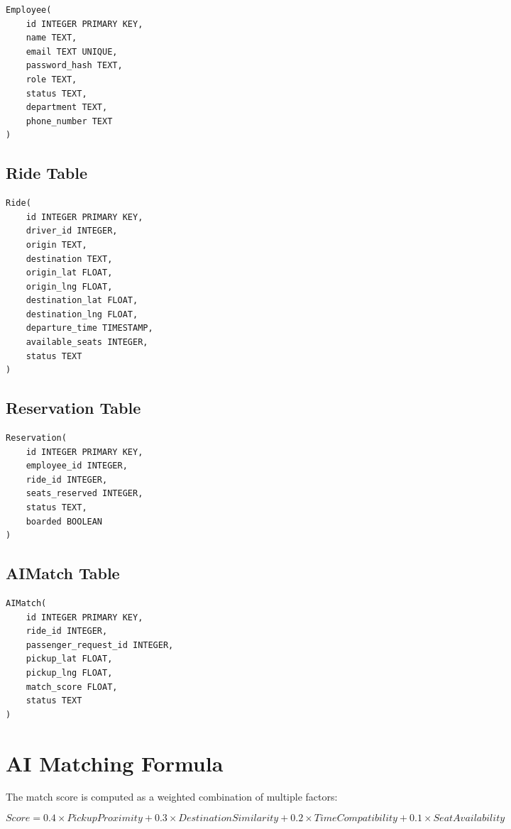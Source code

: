 \begin{verbatim}
Employee(
    id INTEGER PRIMARY KEY,
    name TEXT,
    email TEXT UNIQUE,
    password_hash TEXT,
    role TEXT,
    status TEXT,
    department TEXT,
    phone_number TEXT
)
\end{verbatim}

\subsection{Ride Table}

\begin{verbatim}
Ride(
    id INTEGER PRIMARY KEY,
    driver_id INTEGER,
    origin TEXT,
    destination TEXT,
    origin_lat FLOAT,
    origin_lng FLOAT,
    destination_lat FLOAT,
    destination_lng FLOAT,
    departure_time TIMESTAMP,
    available_seats INTEGER,
    status TEXT
)
\end{verbatim}

\subsection{Reservation Table}

\begin{verbatim}
Reservation(
    id INTEGER PRIMARY KEY,
    employee_id INTEGER,
    ride_id INTEGER,
    seats_reserved INTEGER,
    status TEXT,
    boarded BOOLEAN
)
\end{verbatim}

\subsection{AIMatch Table}

\begin{verbatim}
AIMatch(
    id INTEGER PRIMARY KEY,
    ride_id INTEGER,
    passenger_request_id INTEGER,
    pickup_lat FLOAT,
    pickup_lng FLOAT,
    match_score FLOAT,
    status TEXT
)
\end{verbatim}

\section{AI Matching Formula}

The match score is computed as a weighted combination of multiple factors:

\[
Score =
0.4 \times PickupProximity +
0.3 \times DestinationSimilarity +
0.2 \times TimeCompatibility +
0.1 \times SeatAvailability
\]

